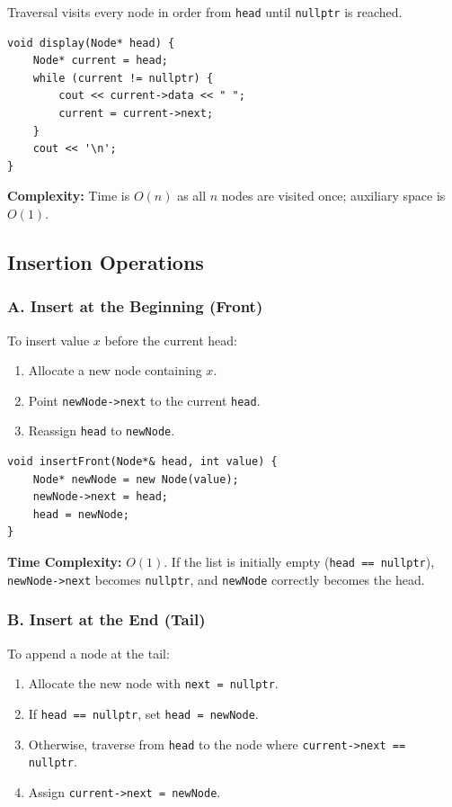 Traversal visits every node in order from \texttt{head} until \texttt{nullptr} is reached.

\begin{lstlisting}[style=cppstyle]
void display(Node* head) {
    Node* current = head;
    while (current != nullptr) {
        cout << current->data << " ";
        current = current->next;
    }
    cout << '\n';
}
\end{lstlisting}

\textbf{Complexity:} Time is $O(n)$ as all $n$ nodes are visited once; auxiliary space is $O(1)$.

\subsection{Insertion Operations}

\subsubsection{A. Insert at the Beginning (Front)}
To insert value $x$ before the current head:
\begin{enumerate}
    \item Allocate a new node containing $x$.
    \item Point \texttt{newNode->next} to the current \texttt{head}.
    \item Reassign \texttt{head} to \texttt{newNode}.
\end{enumerate}

\begin{lstlisting}[style=cppstyle]
void insertFront(Node*& head, int value) {
    Node* newNode = new Node(value);
    newNode->next = head;
    head = newNode;
}
\end{lstlisting}

\textbf{Time Complexity:} $O(1)$. If the list is initially empty (\texttt{head == nullptr}), \texttt{newNode->next} becomes \texttt{nullptr}, and \texttt{newNode} correctly becomes the head.

\subsubsection{B. Insert at the End (Tail)}
To append a node at the tail:
\begin{enumerate}
    \item Allocate the new node with \texttt{next = nullptr}.
    \item If \texttt{head == nullptr}, set \texttt{head = newNode}.
    \item Otherwise, traverse from \texttt{head} to the node where \texttt{current->next == nullptr}.
    \item Assign \texttt{current->next = newNode}.
\end{enumerate}

